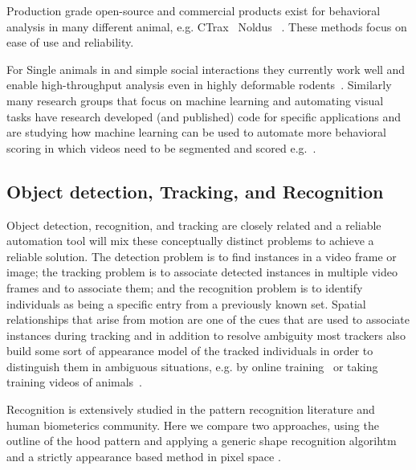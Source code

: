 \documentclass[conference,10pt,times,letter]{IEEEtran}
\begin{document}
Production grade open-source and commercial products exist for behavioral analysis in many different animal, e.g. CTrax~\cite{branson2009ctrax-fly} Noldus~\cite{noldus2001ethovision} \cite{de2012computerized}. These methods focus on ease of use and reliability. 

For Single animals in and simple social interactions they currently work well and enable high-throughput analysis even in highly deformable rodents~\cite{noldus2001ethovision}. Similarly many research groups that focus on machine learning and automating visual tasks have research developed (and published) code for specific applications and are studying how machine learning can be used to automate more behavioral scoring in which videos need to be segmented and scored e.g.~\cite{CRIM13}. 


\subsection{Object detection, Tracking, and Recognition}
Object detection, recognition, and tracking are closely related and a reliable automation tool will mix these conceptually distinct problems to achieve a reliable solution. The detection problem is to find instances in a video frame or image; the tracking problem is to associate detected instances in multiple video frames and to associate them; and the recognition problem is to identify individuals as being a specific entry from a previously known set. 
Spatial relationships that arise from motion are one of the cues that are used to associate instances during tracking and in addition to resolve ambiguity most trackers also build some sort of appearance model of the tracked individuals in order to distinguish them in ambiguous situations, e.g. by online training~\cite{perez2014idtracker} or taking training videos of animals~\cite{ohayon2013multiday}. 


Recognition is extensively studied in the pattern recognition literature and human biometerics community. Here we compare two approaches, using the outline of the hood pattern and applying a generic shape recognition algorihtm \cite{belongie2002shape} and a strictly appearance based method in pixel space \cite{wang2004image,zhang2011fsim}. 
\end{document}
